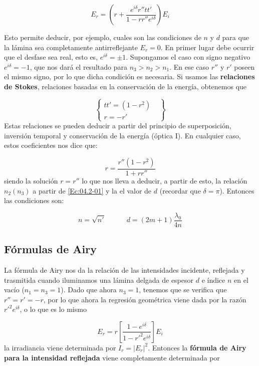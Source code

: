 \documentclass[12pt,a4paper]{book}
\numberwithin{equation}{section}
\numberwithin{figure}{section}
\newcommand{\tquad}{\quad \quad \quad}
\newcommand{\parentesis}[1]{\left( #1  \right)}
\newcommand{\ccorchetes}[1]{\left[ #1  \right]}
\newcommand{\1}{_{(1)}}
\newcommand{\2}{_{(2)}}
\theoremstyle{definition}
\begin{document}
\begin{equation}
E_r = \parentesis{ r + \frac{e^{i\delta}r''tt'}{1-rr''e^{i\delta}}}E_i 
\end{equation}

Esto permite deducir, por ejemplo, cuales son las condiciones de $n$ y $d$ para que la lámina sea completamente antirreflejante $E_r=0$. En primer lugar debe ocurrir que el desfase sea real, esto es, $e^{i\delta}=\pm 1$. Supongamos el caso con signo negativo $e^{i\delta} = -1$, que nos dará el resultado para $n_3>n_2>n_1$. En ese caso $r''$ y $r'$ poseen el mismo signo, por lo que dicha condición es necesaria. Si usamos las \textbf{relaciones de Stokes}, relaciones basadas en la conservación de la energía, obtenemos que

\begin{equation}
\left\lbrace
\begin{array}{ll}
tt'=(1-r^2) & \\
r=-r' &
\end{array}
\right\rbrace
\end{equation}
Estas relaciones se pueden deducir a partir del principio de superposición, inversión temporal y conservación de la energía (óptica I). En cualquier caso, estos coeficientes nos dice que:

\begin{equation}
r = \frac{r'' (1-r^2)}{1+rr''}  
\end{equation}
siendo la solución $r=r''$ lo que nos lleva a deducir, a partir de esto, la relación $n_2(n_3)$ a partir de \ref{Ec:04.2-01} y la el valor de $d$ (recordar que $\delta=\pi$). Entonces las condiciones son:

\begin{equation}
n = \sqrt{n'} \tquad d=(2m+1)\frac{\lambda_0}{4n}
\end{equation}

\subsection{Fórmulas de Airy}

La fórmula de Airy nos da la relación de las intensidades incidente, reflejada y trasmitida cuando iluminamos una lámina delgada de espesor $d$ e índice $n$ en el vacío ($n_1=n_3=1$). Dado que ahora $n_3=1$, tenemos que se verifica que $r''=r'=-r$, por lo que ahora la regresión geométrica viene dada por la razón $r'^2e^{i\delta}$, o lo que es lo mismo

\begin{equation}
E_r = r \ccorchetes{\frac{1-e^{i\delta}}{1-r'^2e^{i\delta}}} E_i
\end{equation}
la irradiancia viene determinada por $I_r=|E_r|^2$. Entonces la \textbf{fórmula de Airy para la intensidad reflejada} viene completamente determinada por
\end{document}

